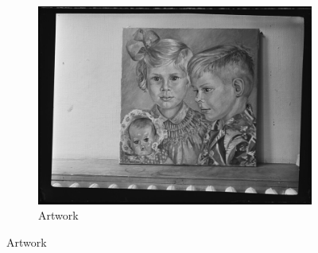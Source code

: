 \documentclass[a4paper,twoside]{article}
\begin{document}
\begin{figure}
\center
 \begin{subfigure}[b]{0.33\textwidth}
    \includegraphics[width=\textwidth]{figures/artwork.jpg}
    \caption{Artwork}
    \label{fig:examplesa}
     \vspace{0.5em}
 \end{subfigure}


\end{figure}
\end{document}
